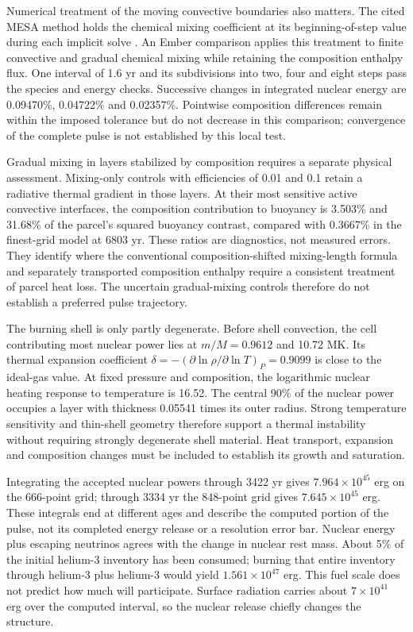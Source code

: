\documentclass[11pt,letterpaper]{article}
\begin{document}
Numerical treatment of the moving convective boundaries also matters.
The cited MESA method holds the chemical mixing coefficient at its
beginning-of-step value during each implicit solve \cite{paxton11}.
An Ember comparison applies this treatment to finite convective and gradual
chemical mixing while retaining the composition enthalpy flux. One interval
of 1.6 yr and its subdivisions into two, four and eight steps pass the
species and energy checks. Successive changes in integrated nuclear energy
are 0.09470\%, 0.04722\% and 0.02357\%. Pointwise composition differences
remain within the imposed tolerance but do not decrease in this comparison;
convergence of the complete pulse is not established by this local test.

Gradual mixing in layers stabilized by composition requires a separate
physical assessment. Mixing-only controls with efficiencies of 0.01 and 0.1
retain a radiative thermal gradient in those layers. At their most sensitive
active convective interfaces, the composition contribution to buoyancy is
3.503\% and 31.68\% of the parcel's squared buoyancy contrast, compared with
0.3667\% in the finest-grid model at 6803 yr. These ratios are diagnostics,
not measured errors. They identify where the conventional composition-shifted
mixing-length formula and separately transported composition enthalpy require
a consistent treatment of parcel heat loss. The uncertain gradual-mixing
controls therefore do not establish a preferred pulse trajectory.

The burning shell is only partly degenerate. Before shell convection,
the cell contributing most nuclear power lies at $m/M=0.9612$ and 10.72 MK.
Its thermal expansion coefficient
$\delta=-(\partial\ln\rho/\partial\ln T)_P=0.9099$ is close to the ideal-gas
value. At fixed pressure and composition, the logarithmic nuclear
heating response to temperature is 16.52. The central 90\% of the nuclear
power occupies a layer with thickness 0.05541 times its outer radius.
Strong temperature sensitivity and thin-shell geometry therefore support
a thermal instability without requiring strongly degenerate shell material.
Heat transport, expansion and composition changes must be included to
establish its growth and saturation.

Integrating the accepted nuclear powers through 3422 yr gives
$7.964\times10^{45}$ erg on the 666-point grid; through 3334 yr the
848-point grid gives $7.645\times10^{45}$ erg.
These integrals end at different ages and describe the computed portion
of the pulse, not its completed energy release or a resolution error bar.
Nuclear energy plus escaping neutrinos agrees with the change in nuclear
rest mass. About 5\% of the initial helium-3 inventory has been consumed;
burning that entire inventory through helium-3 plus helium-3 would yield
$1.561\times10^{47}$ erg. This fuel scale does not predict how much will
participate. Surface radiation carries about $7\times10^{41}$ erg over
the computed interval, so the nuclear release chiefly changes the structure.
\end{document}
